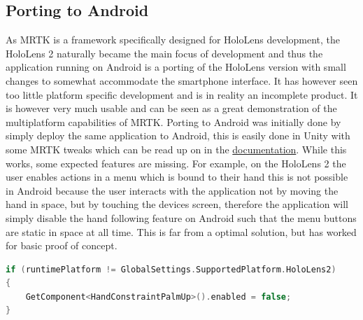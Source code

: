 \subsection{Porting to Android}

As MRTK is a framework specifically designed for HoloLens development, the HoloLens 2 naturally became the main focus of development and thus the application running on Android is a porting of the HoloLens version with small changes to somewhat accommodate the smartphone interface. It has however seen too little platform specific development and is in reality an incomplete product. It is however very much usable and can be seen as a great demonstration of the multiplatform capabilities of MRTK. 
Porting to Android was initially done by simply deploy the same application to Android, this is easily done in Unity with some MRTK tweaks which can be read up on in the \href{https://microsoft.github.io/MixedRealityToolkit-Unity/version/releases/2.2.0/Documentation/CrossPlatform/UsingARFoundation.html}{documentation}. While this works, some expected features are missing. For example, on the HoloLens 2 the user enables actions in a menu which is bound to their hand this is not possible in Android because the user interacts with the application not by moving the hand in space, but by touching the devices screen, therefore the application will simply disable the hand following feature on Android such that the menu buttons are static in space at all time. This is far from a optimal solution, but has worked for basic proof of concept. 
\begin{lstlisting}[language=c, caption={Basic example of separate features per device.}, label={item:androidcode}]
if (runtimePlatform != GlobalSettings.SupportedPlatform.HoloLens2)
{
    GetComponent<HandConstraintPalmUp>().enabled = false;
}
\end{lstlisting}




